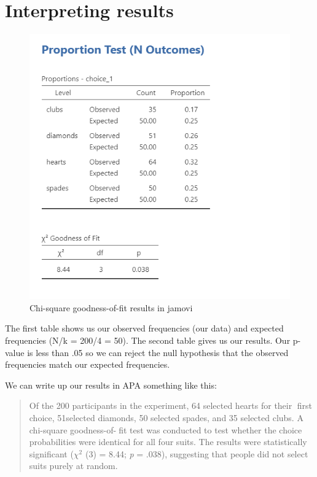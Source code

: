 \documentclass[
]{book}
\begin{document}
\hypertarget{interpreting-results-5}{%
\section{Interpreting results}\label{interpreting-results-5}}

\begin{figure}

{\centering \includegraphics[width=1\linewidth]{images/09-chi-square/chi-square_results} 

}

\caption{Chi-square goodness-of-fit results in jamovi}\label{fig:unnamed-chunk-5}
\end{figure}

The first table shows us our observed frequencies (our data) and expected frequencies (N/k = 200/4 = 50). The second table gives us our results. Our p-value is less than .05 so we can reject the null hypothesis that the observed frequencies match our expected frequencies.

We can write up our results in APA something like this:

\begin{quote}
Of the 200 participants in the experiment, 64 selected hearts for their first choice, 51selected diamonds, 50 selected spades, and 35 selected clubs. A chi-square goodness-of-fit test was conducted to test whether the choice probabilities were identical for all four suits. The results were statistically significant (\(\chi^2\) (3) = 8.44; \emph{p} = .038), suggesting that people did not select suits purely at random.
\end{quote}
\end{document}
